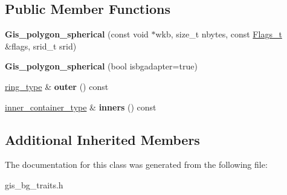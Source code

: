 \subsection*{Public Member Functions}
\begin{DoxyCompactItemize}
\item 
\mbox{\label{classGis__polygon__spherical_acca86fdd824075697077fabc81cb13bd}} 
{\bfseries Gis\+\_\+polygon\+\_\+spherical} (const void $\ast$wkb, size\+\_\+t nbytes, const \mbox{\hyperlink{classGeometry_1_1Flags__t}{Flags\+\_\+t}} \&flags, srid\+\_\+t srid)
\item 
\mbox{\label{classGis__polygon__spherical_a91620a9140e904c5ee4889dd89ac3f82}} 
{\bfseries Gis\+\_\+polygon\+\_\+spherical} (bool isbgadapter=true)
\item 
\mbox{\label{classGis__polygon__spherical_a7d9fb4d52dad66d1d8aba3b6c1f89ffa}} 
\mbox{\hyperlink{classGis__polygon__ring__spherical}{ring\+\_\+type}} \& {\bfseries outer} () const
\item 
\mbox{\label{classGis__polygon__spherical_a3af80405dc2548a99b6d0dc86590f345}} 
\mbox{\hyperlink{classGis__wkb__vector}{inner\+\_\+container\+\_\+type}} \& {\bfseries inners} () const
\end{DoxyCompactItemize}
\subsection*{Additional Inherited Members}


The documentation for this class was generated from the following file\+:\begin{DoxyCompactItemize}
\item 
gis\+\_\+bg\+\_\+traits.\+h\end{DoxyCompactItemize}
